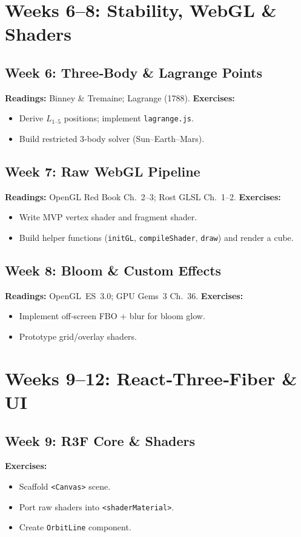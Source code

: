 \documentclass[11pt]{article}
\begin{document}
\section{Weeks 6--8: Stability, WebGL & Shaders}
\subsection{Week 6: Three‑Body \& Lagrange Points}
\textbf{Readings:} Binney \& Tremaine; Lagrange (1788).  
\textbf{Exercises:}
\begin{itemize}
  \item Derive \(L_{1\text{--}5}\) positions; implement \texttt{lagrange.js}.
  \item Build restricted 3‑body solver (Sun–Earth–Mars).
\end{itemize}
\subsection{Week 7: Raw WebGL Pipeline}
\textbf{Readings:} OpenGL Red Book Ch.~2–3; Rost GLSL Ch.~1–2.  
\textbf{Exercises:}
\begin{itemize}
  \item Write MVP vertex shader and fragment shader.
  \item Build helper functions (\texttt{initGL}, \texttt{compileShader}, \texttt{draw}) and render a cube.
\end{itemize}
\subsection{Week 8: Bloom & Custom Effects}
\textbf{Readings:} OpenGL ES 3.0; GPU Gems 3 Ch.~36.  
\textbf{Exercises:}
\begin{itemize}
  \item Implement off‑screen FBO + blur for bloom glow.
  \item Prototype grid/overlay shaders.
\end{itemize}

\section{Weeks 9--12: React‑Three‑Fiber & UI}
\subsection{Week 9: R3F Core \& Shaders}
\textbf{Exercises:}
\begin{itemize}
  \item Scaffold \texttt{<Canvas>} scene.
  \item Port raw shaders into \texttt{<shaderMaterial>}.
  \item Create \texttt{OrbitLine} component.
\end{itemize}
\end{document}
